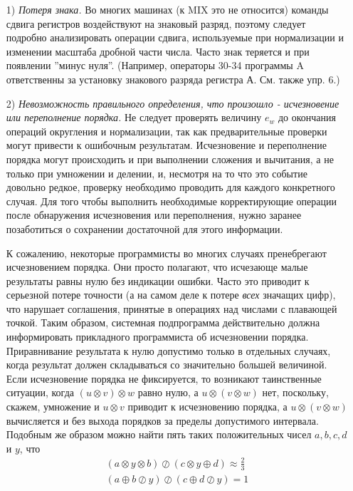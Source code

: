 \begin{enumerate}
\item[1)] \textit{Потеря знака.} Во многих машинах (к MIX это не относится) команды сдвига регистров воздействуют на знаковый разряд, поэтому следует подробно анализировать операции сдвига, используемые при нормализации и изменении масштаба дробной части числа. Часто знак теряется и при появлении ''минус нуля''. (Например, операторы 30-34 программы A ответственны за установку знакового разряда регистра А. См. также упр. 6.)

\item[2)] \textit{Невозможность правильного определения, что произошло - исчезновение или переполнение порядка.} Не следует проверять величину $e_w$ до окончания операций округления и нормализации, так как предварительные проверки могут привести к ошибочным результатам. Исчезновение и переполнение порядка могут происходить и при выполнении сложения и вычитания, а не только при умножении и делении, и, несмотря на то что это событие довольно редкое, проверку необходимо проводить для каждого конкретного случая. Для того чтобы выполнить необходимые корректирующие операции после обнаружения исчезновения или переполнения, нужно заранее позаботиться о сохранении достаточной для этого информации.

К сожалению, некоторые программисты во многих случаях пренебрегают исчезновением порядка. Они просто полагают, что исчезающе малые результаты равны нулю без индикации ошибки. Часто это приводит к серьезной потере точности (а на самом деле к потере \textit{всех} значащих цифр), что нарушает соглашения, принятые в операциях над числами с плавающей точкой. Таким образом, системная подпрограмма действительно должна информировать прикладного программиста об исчезновении порядка. Приравнивание результата к нулю допустимо только в отдельных случаях, когда результат должен складываться со значительно большей величиной. Если исчезновение порядка не фиксируется, то возникают таинственные ситуации, когда $(u \otimes v) \otimes w$ равно нулю, а $u \otimes (v \otimes w)$ нет, поскольку, скажем, умножение и $u \otimes v$ приводит к исчезновению порядка, а $u \otimes ( v \otimes w)$ вычисляется и без выхода порядков за пределы допустимого интервала. Подобным же образом можно найти пять таких положительных чисел $a,b,c,d$ и $y$, что
\begin{equation} \label{q1}
\begin{array}{c} 
(a \otimes y \otimes b ) \oslash (c \otimes y \oplus d) \approx \frac{2}{3}\\
(a \oplus b \oslash y) \oslash (c \oplus d \oslash y) = 1\\
\end{array}
\end{equation}


\end{enumerate}
